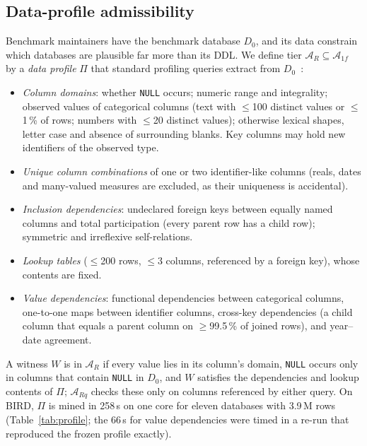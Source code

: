 \subsection{Data-profile admissibility}\label{sec:profile}
Benchmark maintainers have the benchmark database $D_0$, and its data constrain which databases are plausible far more than its DDL. We define tier $\mathcal A_R\subseteq\mathcal A_{1f}$ by a \emph{data profile} $\Pi$ that standard profiling queries extract from $D_0$~\cite{abedjan2015profiling}:
\begin{itemize}
\item \emph{Column domains}: whether \texttt{NULL} occurs; numeric range and integrality; observed values of categorical columns (text with $\le$100 distinct values or $\le$1\,\% of rows; numbers with $\le$20 distinct values); otherwise lexical shapes, letter case and absence of surrounding blanks. Key columns may hold new identifiers of the observed type.
\item \emph{Unique column combinations} of one or two identifier-like columns (reals, dates and many-valued measures are excluded, as their uniqueness is accidental).
\item \emph{Inclusion dependencies}: undeclared foreign keys between equally named columns and total participation (every parent row has a child row); symmetric and irreflexive self-relations.
\item \emph{Lookup tables} ($\le$200 rows, $\le$3 columns, referenced by a foreign key), whose contents are fixed.
\item \emph{Value dependencies}: functional dependencies between categorical columns, one-to-one maps between identifier columns, cross-key dependencies (a child column that equals a parent column on $\ge$99.5\,\% of joined rows), and year--date agreement.
\end{itemize}
A witness $W$ is in $\mathcal A_R$ if every value lies in its column's domain, \texttt{NULL} occurs only in columns that contain \texttt{NULL} in $D_0$, and $W$ satisfies the dependencies and lookup contents of $\Pi$; $\mathcal A_{Rq}$ checks these only on columns referenced by either query. On BIRD, $\Pi$ is mined in 258\,s on one core for eleven databases with 3.9\,M rows (Table~\ref{tab:profile}; the 66\,s for value dependencies were timed in a re-run that reproduced the frozen profile exactly).

